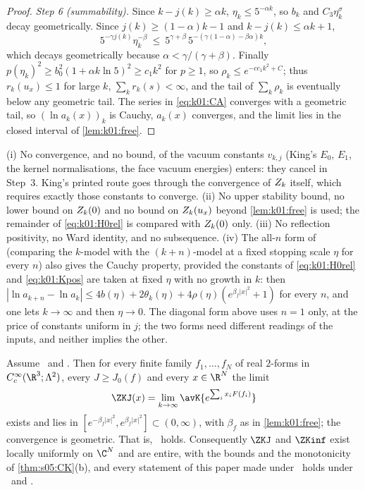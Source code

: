 \begin{proof}
\emph{Step 6 (summability).} Since $k-j(k)\ge\alpha k$, $\eta_k\le5^{-\alpha k}$, so $b_k$ and $C_3\eta_k^\sigma$ decay geometrically. Since $j(k)\ge(1-\alpha)k-1$ and $k-j(k)\le\alpha k+1$,
\[
5^{-\gamma j(k)}\eta_k^{-\beta}\ \le\ 5^{\gamma+\beta}\,5^{-(\gamma(1-\alpha)-\beta\alpha)k},
\]
which decays geometrically because $\alpha<\gamma/(\gamma+\beta)$. Finally $p(\eta_k)^2\ge b_0^2(1+\alpha k\ln5)^{2}\ge c_1k^2$ for $p\ge1$, so $\rho_k\le e^{-cc_1k^2+C}$; thus $r_k(u_x)\le1$ for large $k$, $\sum_kr_k(s)<\infty$, and the tail of $\sum_k\rho_k$ is eventually below any geometric tail. The series in \eqref{eq:k01:CA} converges with a geometric tail, so $(\ln a_k(x))_k$ is Cauchy, $a_k(x)$ converges, and the limit lies in the closed interval of \cref{lem:k01:free}.
\end{proof}

\begin{remark}\label{rem:k01:notused}
(i) No convergence, and no bound, of the vacuum constants $v_{k,j}$ (King's $E_0$, $E_1$, the kernel normalisations, the face vacuum energies) enters: they cancel in Step~3. King's printed route \cite[p.~329]{K2} goes through the convergence of $Z_{k}$ itself, which requires exactly those constants to converge. (ii) No upper stability bound, no lower bound on $Z_{k}(0)$ and no bound on $Z_{k}(u_x)$ beyond \cref{lem:k01:free} is used; the remainder of \eqref{eq:k01:H0rel} is compared with $Z_{k}(0)$ only. (iii) No reflection positivity, no Ward identity, and no subsequence. (iv) The all-$n$ form of \cite[(3.13)]{K1} (comparing the $k$-model with the $(k+n)$-model at a fixed stopping scale $\eta$ for every $n$) also gives the Cauchy property, provided the constants of \eqref{eq:k01:H0rel} and \eqref{eq:k01:Kpos} are taken at fixed $\eta$ with no growth in $k$: then $|\ln a_{k+n}-\ln a_k|\le4b(\eta)+2\theta_k(\eta)+4\rho(\eta)(e^{\beta_f|x|^2}+1)$ for every $n$, and one lets $k\to\infty$ and then $\eta\to0$. The diagonal form above uses $n=1$ only, at the price of constants uniform in $j$; the two forms need different readings of the inputs, and neither implies the other.
\end{remark}

\begin{theorem}\label{thm:k01:EC}
Assume \BALint\ and \RENorb. Then for every finite family $f_1,\dots,f_N$ of real $2$-forms in $C^\infty_c(\R^3;\Lambda^2)$, every $J\ge J_0(f)$ and every $x\in\R^N$ the limit
\[
\ZKJ(x)=\lim_{k\to\infty}\avK{e^{\sum_ix_iF(f_i)}}
\]
exists and lies in $[e^{-\beta_f|x|^2},e^{\beta_f|x|^2}]\subset(0,\infty)$, with $\beta_f$ as in \cref{lem:k01:free}; the convergence is geometric. That is, \EC\ holds. Consequently $\ZKJ$ and $\ZKinf$ exist locally uniformly on $\C^N$ and are entire, with the bounds and the monotonicity of \cref{thm:s05:CK}(b), and every statement of this paper made under \EC\ holds under \BALint\ and \RENorb.
\end{theorem}


